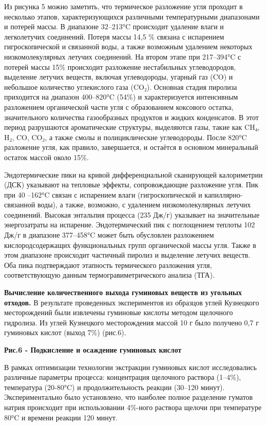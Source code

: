 Из рисунка 5 можно заметить, что термическое разложение угля проходит в
несколько этапов, характеризующихся различными температурными
диапазонами и потерей массы. В диапазоне 32--213°C происходит удаление
влаги и легколетучих соединений. Потеря массы 14,5 \% связана с
испарением гигроскопической и связанной воды, а также возможным
удалением некоторых низкомолекулярных летучих соединений. На втором
этапе при 217--394°C с потерей массы 15\% происходит разложение
нестабильных углеводородов, выделение летучих веществ, включая
углеводороды, угарный газ (CO) и небольшое количество углекислого газа
(CO₂). Основная стадия пиролиза приходится на диапазон 400--820°C (54\%)
и характеризуется интенсивным разложением органической части угля с
образованием коксового остатка, значительного количества газообразных
продуктов и жидких конденсатов. В этот период разрушаются ароматические
структуры, выделяются газы, такие как CH₄, H₂, CO, CO₂, а также смолы и
полициклические углеводороды. После 820°C разложение угля, как правило,
завершается, и остаётся в основном минеральный остаток массой около
15\%.

Эндотермические пики на кривой дифференциальной сканирующей калориметрии
(ДСК) указывают на тепловые эффекты, сопровождающие разложение угля. Пик
при 40 --162°C связан с испарением влаги (гигроскопической и
капиллярно-связанной воды), а также, возможно, с удалением
низкомолекулярных летучих соединений. Высокая энтальпия процесса (235
Дж/г) указывает на значительные энергозатраты на испарение.
Эндотермический пик с поглощением теплоты 102 Дж/г в диапазоне
377--458°C может быть обусловлен разложением кислородсодержащих
функциональных групп органической массы угля. Также в этом диапазоне
происходит частичный пиролиз и выделение летучих веществ. Оба пика
подтверждают этапность термического разложения угля, соответствующую
данным термогравиметрического анализа (ТГА).

{\bfseries Вычисление количественного выхода гуминовых веществ из угольных
отходов.} В результате проведенных экспериментов из образцов углей
Кузнецкого месторождений были извлечены гуминовые кислоты методом
щелочного гидролиза. Из углей Кузнецкого месторождения массой 10 г было
получено 0,7 г гуминовых кислот (выход 7\%) (рис.6).

{\bfseries Рис.6 - Подкисление и осаждение гуминовых кислот}

В рамках оптимизации технологии экстракции гуминовых кислот
исследовались различные параметры процесса: концентрация щелочного
раствора (1--4\%), температура (20-80°C) и продолжительность реакции
(30--120 минут). Экспериментально было установлено, что наиболее полное
разделение гуматов натрия происходит при использовании 4\%-ного раствора
щелочи при температуре 80°C и времени реакции 120 минут.


